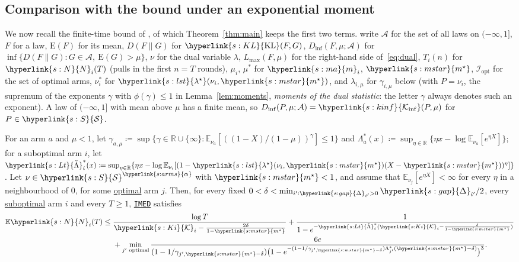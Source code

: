 \documentclass[11pt]{article}
\newcommand{\E}{\mathbb{E}}
\newcommand{\R}{\mathbb{R}}
\newcommand{\sy}[2]{{\hyperlink{#1}{#2}}}
\newcommand{\term}[2]{\hyperlink{#1}{#2}}
\newcommand{\imed}{\hyperref[alg:imed]{\texttt{IMED}}}
\newcommand{\Sm}{\sy{s:S}{\mathcal{S}}}
\newcommand{\arms}{\sy{s:arms}{\alpha}}
\newcommand{\marm}{\sy{s:ma}{m}}
\newcommand{\ms}{\sy{s:mstar}{m^{\star}}}
\newcommand{\gap}{\sy{s:gap}{\Delta}}
\newcommand{\KL}{\sy{s:KL}{\mathrm{KL}}}
\newcommand{\Kinf}{\sy{s:kinf}{\mathcal{K}_{\inf}}}
\newcommand{\Np}{\sy{s:N}{N}}
\newcommand{\lst}{\sy{s:lst}{\lambda^{\star}}}
\newcommand{\Lt}{\sy{s:Lt}{\tilde{\Lambda}}}
\newcommand{\Ki}{\sy{s:Ki}{\mathcal{K}}}
\begin{document}
\subsection{Comparison with the bound under an exponential moment}\label{sec:upper-ht15}

We now recall the finite-time bound of \citet{HT15}, of which Theorem~\ref{thm:main} keeps the first
two terms. \citet{HT15} write $\mathcal A$ for the set of all laws on $(-\infty,1]$, $F$ for a law, $\mathrm
E(F)$ for its mean, $D(F\|G)$ for $\KL(F,G)$, $D_{\inf}(F,\mu;\mathcal A)$ for
$\inf\{D(F\|G):G\in\mathcal A,\ \mathrm E(G)>\mu\}$, $\nu$ for the dual variable $\lambda$,
$L_{\max}(F,\mu)$ for the right-hand side of~\eqref{eq:dual}, $T_i(n)$ for $\Np_i(T)$ (pulls in the
first $n=T$ rounds), $\mu_i$, $\mu^*$ for $\marm_i$, $\ms$, $\mathcal I_{\mathrm{opt}}$ for the set of optimal
arms, $\nu_i^*$ for $\lst(\nu_i,\ms)$, and $\lambda_{i,\mu}$ for $\gamma_{i,\mu}$ below (with $P=\nu_i$, the
supremum of the exponents $\gamma$ with $\phi(\gamma)\le1$ in Lemma~\ref{lem:moments}, \emph{moments
of the dual statistic}: the letter $\gamma$ always denotes such an exponent). A law
of $(-\infty,1]$ with mean above $\mu$ has a finite mean, so $D_{\inf}(P,\mu;\mathcal A)=\Kinf(P,\mu)$
for $P\in\Sm$.


\begin{theorem}\label{cite:HT15-thm3}
For an arm $a$ and $\mu<1$, let $\gamma_{a,\mu}\coloneqq\sup\{\gamma\in\R\cup\{\infty\}:
\E_{\nu_a}[((1-X)/(1-\mu))^\gamma]\le1\}$ and $\Lambda_a^*(x)\coloneqq\sup_{\eta\in\R}\{\eta x-\log
\E_{\nu_a}[e^{\eta X}]\}$; for a suboptimal arm $i$, let
$\Lt_i^*(x)\coloneqq\sup_{\eta\in\R}\{\eta x-\log\E_{\nu_i}[(1-\lst(\nu_i,\ms)(X-\ms))^\eta]\}$.
Let $\nu\in\Sm^\arms$ with $\ms<1$, and assume that $\E_{\nu_j}[e^{\eta X}]<\infty$ for every $\eta$ in
a neighbourhood of $0$, for some \term{w:optimal}{optimal} arm $j$. Then, for every fixed
$0<\delta<\min_{i':\gap_{i'}>0}\gap_{i'}/2$, every \term{w:subopt}{suboptimal} arm $i$ and every $T\ge1$, \imed{}
satisfies
\begin{align*}
  \E \Np_i(T)\le{}&\frac{\log T}{\Ki_i-\frac{2\delta}{1-\ms}}+\frac{1}{1-e^{-\Lt_i^*(\Ki_i-\frac{\delta}{1-\ms})}}\\
  &+\min_{j'\text{ optimal}}\frac{6e}{(1-1/\gamma_{j',\ms-\delta})\big(1-e^{-(1-1/\gamma_{j',\ms-\delta})\Lambda_{j'}^*(\ms-\delta)}\big)^3}.
\end{align*}
\end{theorem}
\end{document}
